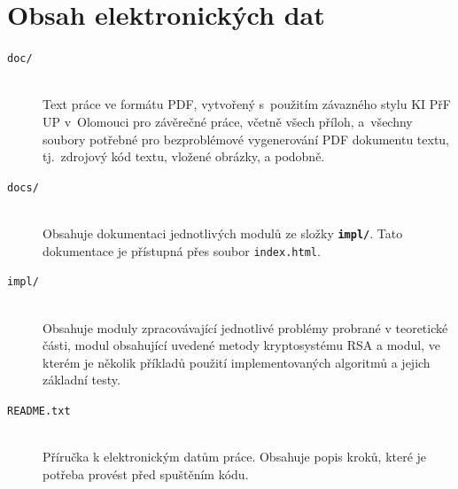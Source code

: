 \documentclass[
  program=infoi,
  biblatex=false,
  figures=true,
  glossaries,
  tables=false,
  sourcecodes=true,
  index
]{kidiplom}
\begin{document}
\appendix

\section{Obsah elektronických dat}

\begin{description}

    \item[\texttt{doc/}] \hfill \\
        Text práce ve formátu PDF, vytvořený s~použitím závazného stylu KI
        PřF UP v~Olomouci pro závěrečné práce, včetně všech příloh,
        a~všechny soubory potřebné pro bezproblémové vygenerování PDF
        dokumentu textu, tj.~zdrojový kód textu, vložené
        obrázky, a podobně.
    
    \item[\texttt{docs/}] \hfill \\
    Obsahuje dokumentaci jednotlivých modulů ze složky \textbf{\texttt{impl/}}. Tato dokumentace je přístupná přes soubor \texttt{index.html}.

    \item[\texttt{impl/}] \hfill \\
        Obsahuje moduly zpracovávající jednotlivé problémy probrané v teoretické části,
        modul obsahující uvedené metody kryptosystému RSA a modul, ve kterém je několik příkladů použití
        implementovaných algoritmů a jejich základní testy.

    \item[\texttt{README.txt}] \hfill \\
        Příručka k elektronickým datům práce.
        Obsahuje popis kroků, které je potřeba provést před spuštěním kódu.
      
\end{description}
\end{document}
